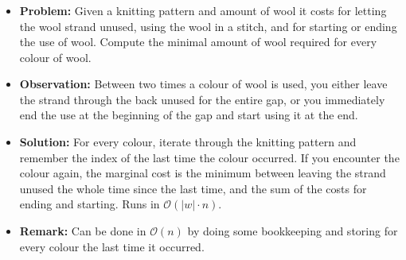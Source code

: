 \begin{frame}
    \frametitle{\problemtitle}
    \begin{itemize}
        \item<+-> \textbf{Problem:} Given a knitting pattern and amount of wool it costs for letting the wool strand unused, using the
            wool in a stitch, and for starting or ending the use of wool. Compute the minimal amount of wool required
            for every colour of wool.
        \item<+-> \textbf{Observation:} Between two times a colour of wool is used,
            you either leave the strand through the back unused for the entire gap,
            or you immediately end the use at the beginning of the gap and start using it at the end.
        \item<+-> \textbf{Solution:} For every colour, iterate through the knitting pattern and remember the index of the
            last time the colour occurred. If you encounter the colour again, the marginal cost is the minimum
            between leaving the strand unused the whole time since the last time, and the sum of the costs for ending
            and starting. Runs in $\mathcal O(|w| \cdot n)$.
        \item<+-> \textbf{Remark:} Can be done in $\mathcal O(n)$ by doing some bookkeeping and storing for every colour the
            last time it occurred.
    \end{itemize}
    \solvestats
\end{frame}
